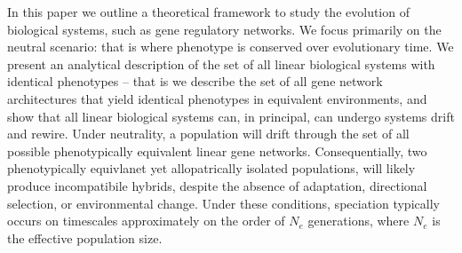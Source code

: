 \documentclass{article}
\newcommand{\1}{\mathbbm{1}}
\begin{document}
In this paper we outline a theoretical framework to study the evolution of biological systems, such as gene regulatory networks. 
We focus primarily on the neutral scenario: 
that is where phenotype is conserved over evolutionary time. 
We present an analytical description of the set of all linear biological systems with identical phenotypes 
-- that is we describe the set of all gene network architectures that yield identical phenotypes in equivalent environments, and show that all linear biological systems can, in principal, can undergo systems drift and rewire. 
Under neutrality, a population will drift through the set of all possible phenotypically equivalent linear gene networks.
Consequentially, two phenotypically equivlanet yet allopatrically isolated populations, will likely produce incompatibile hybrids, despite the absence of adaptation, directional selection, or environmental change.
Under these conditions, speciation typically occurs on timescales approximately on the order of $N_{e}$ generations, where $N_{e}$ is the effective population size.
%
\end{document}
